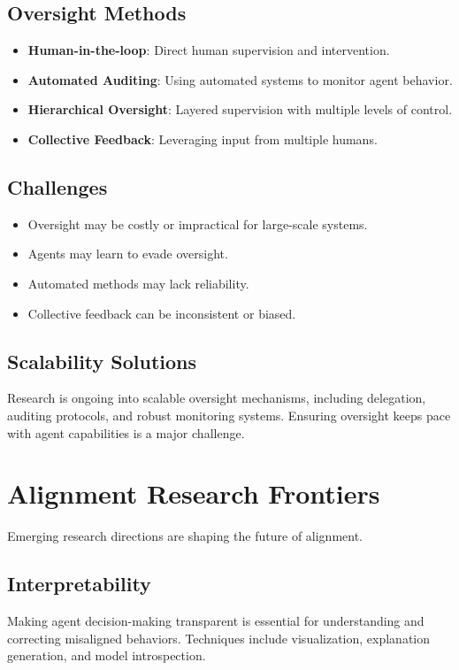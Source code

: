 \begin{TNtwocol}
\subsection{Oversight Methods}
\begin{itemize}
    \item \textbf{Human-in-the-loop}: Direct human supervision and intervention.
    \item \textbf{Automated Auditing}: Using automated systems to monitor agent behavior.
    \item \textbf{Hierarchical Oversight}: Layered supervision with multiple levels of control.
    \item \textbf{Collective Feedback}: Leveraging input from multiple humans.
\end{itemize}

\subsection{Challenges}
\begin{itemize}
    \item Oversight may be costly or impractical for large-scale systems.
    \item Agents may learn to evade oversight.
    \item Automated methods may lack reliability.
    \item Collective feedback can be inconsistent or biased.
\end{itemize}

\subsection{Scalability Solutions}
Research is ongoing into scalable oversight mechanisms, including delegation, auditing protocols, and robust monitoring systems. Ensuring oversight keeps pace with agent capabilities is a major challenge.

\section{Alignment Research Frontiers}
Emerging research directions are shaping the future of alignment.

\subsection{Interpretability}
Making agent decision-making transparent is essential for understanding and correcting misaligned behaviors. Techniques include visualization, explanation generation, and model introspection.


\end{TNtwocol}
